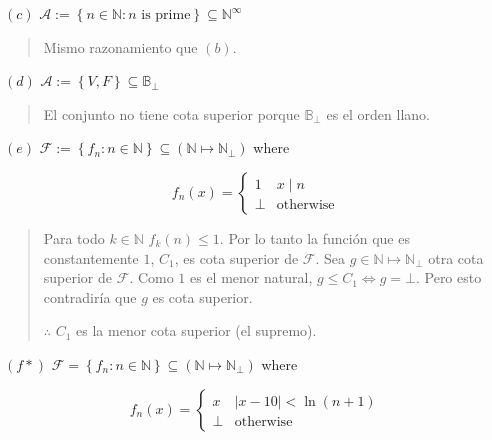 \documentclass[article, 12pt]{article}
\begin{document}
$(c)$ $\mathcal{A} := \left\{ n \in \mathbb{N} : n \text{ is prime} \right\}
\subseteq \mathbb{N}^\infty$


\small
\begin{quote}

Mismo razonamiento que $(b)$.

\end{quote}
\normalsize


$(d)$ $\mathcal{A} := \left\{ V, F \right\} \subseteq \mathbb{B}_\bot$


\small
\begin{quote}

El conjunto no tiene cota superior porque $\mathbb{B}_\bot $ es el orden llano.

\end{quote}
\normalsize


$(e)$ $\mathcal{F} := \left\{ f_n : n \in \mathbb{N} \right\} \subseteq
\left( \mathbb{N} \mapsto \mathbb{N}_\bot  \right) $ where 

\begin{equation*}
  f_n(x) = \begin{cases}
    1 & x \mid n \\ 
    \bot & \text{otherwise}
  \end{cases}
\end{equation*}


\small
\begin{quote}

Para todo $k\in \mathbb{N}$ $f_k(n) \leq 1$. Por lo tanto la función que es
constantemente $1$, $C_1$, es cota superior de $\mathcal{F}$. Sea 
$g \in \mathbb{N} \mapsto \mathbb{N}_\bot$ otra cota superior de $\mathcal{F}$.
Como $1$ es el menor natural, $g \leq C_1 \iff g = \bot $. Pero esto
contradiría que $g$ es cota superior. 

$\therefore $ $C_1$ es la menor cota superior (el supremo).


\end{quote}
\normalsize


$(f*)$ $\mathcal{F} = \left\{ f_n : n \in \mathbb{N} \right\} \subseteq
\left( \mathbb{N} \mapsto \mathbb{N}_\bot  \right) $ where 

\begin{equation*}
  f_n(x) = \begin{cases}
    x & |x - 10| < \ln \left( n + 1 \right) \\ 
    \bot  & \text{otherwise}
  \end{cases}
\end{equation*}
\end{document}
